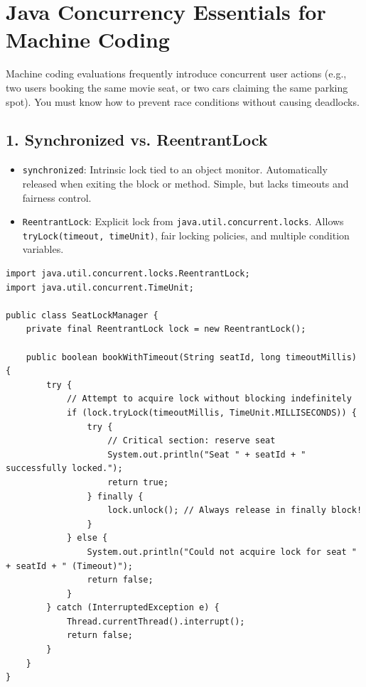 \documentclass[10pt,journal,compsoc,onecolumn]{IEEEtran}
\begin{document}
\section{Java Concurrency Essentials for Machine Coding}
\label{sec:concurrency}

Machine coding evaluations frequently introduce concurrent user actions (e.g., two users booking the same movie seat, or two cars claiming the same parking spot). You must know how to prevent race conditions without causing deadlocks.

\subsection{1. Synchronized vs. ReentrantLock}
\begin{itemize}
    \item \texttt{synchronized}: Intrinsic lock tied to an object monitor. Automatically released when exiting the block or method. Simple, but lacks timeouts and fairness control.
    \item \texttt{ReentrantLock}: Explicit lock from \texttt{java.util.concurrent.locks}. Allows \texttt{tryLock(timeout, timeUnit)}, fair locking policies, and multiple condition variables.
\end{itemize}

\begin{verbatim}
import java.util.concurrent.locks.ReentrantLock;
import java.util.concurrent.TimeUnit;

public class SeatLockManager {
    private final ReentrantLock lock = new ReentrantLock();

    public boolean bookWithTimeout(String seatId, long timeoutMillis) {
        try {
            // Attempt to acquire lock without blocking indefinitely
            if (lock.tryLock(timeoutMillis, TimeUnit.MILLISECONDS)) {
                try {
                    // Critical section: reserve seat
                    System.out.println("Seat " + seatId + " successfully locked.");
                    return true;
                } finally {
                    lock.unlock(); // Always release in finally block!
                }
            } else {
                System.out.println("Could not acquire lock for seat " + seatId + " (Timeout)");
                return false;
            }
        } catch (InterruptedException e) {
            Thread.currentThread().interrupt();
            return false;
        }
    }
}
\end{verbatim}
\end{document}
